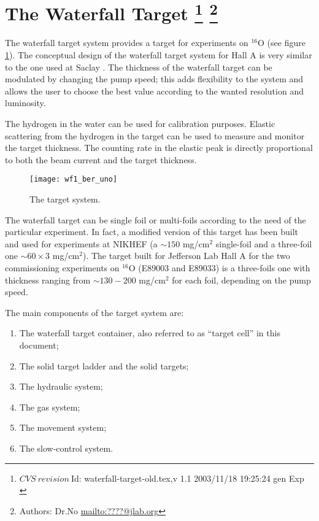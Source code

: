 \section[The Waterfall Target]{The Waterfall Target
\footnote{
  $ CVS~revision~ $Id: waterfall-target-old.tex,v 1.1 2003/11/18 19:25:24 gen Exp $ $
}
\footnote{Authors: Dr.No \url{mailto:????@jlab.org}}
}

The waterfall target system provides a target for experiments on 
$^{16}$O (see figure \ref{fig:uno}). 
The conceptual design of the waterfall target system for Hall A  is
very similar to the one used at Saclay \cite{Garibaldi:1992mb}.
The thickness of the waterfall target can 
be modulated by changing the pump speed; this 
adds flexibility to the system and allows the user to choose the best
value according to the wanted resolution and luminosity.

The hydrogen in the water can be used for calibration purposes.
Elastic scattering  from the hydrogen in the target can be used to 
measure and monitor the target thickness. The counting rate in the elastic
peak is directly proportional to both the beam current and 
the target thickness.

\begin{figure}[htbp]
\begin{center}
\texttt{[image: wf1\_ber\_uno]}
\caption[Waterfall Target System]{The target system.}
\label{fig:uno}
\end{center}
\end{figure}


The waterfall target can be single foil or multi-foils according to
the need of the particular experiment. In fact, a modified version of this 
target has been built  and used for experiments at NIKHEF (a
$\sim 150$ mg/cm$^2$ single-foil and a three-foil one 
$\sim 60 \times 3$ mg/cm$^2$). 
The target built for Jefferson Lab Hall A for the two commissioning 
experiments on $^{16}$O (E89003 and E89033) is a three-foils  one  with 
thickness ranging from $\sim 130-200$ mg/cm$^2$ for each foil, 
depending on the pump speed. 

The main components of the target system are:
\begin{enumerate}
\item The waterfall target container, also referred to as ``target cell'' in this document;
\item The solid target ladder and the solid targets; 
\item The hydraulic system;
\item The gas system;
\item The movement system;
\item The slow-control system.
\end{enumerate}

